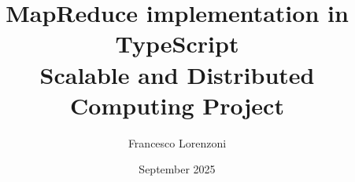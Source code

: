 


\lstset{language=JavaScript}



\lstset{
  language=JavaScript
}

\let\oldverb\verb

\makeatletter
\def\verb{\@ifnextchar|{\verb@colored}{\oldverb}}
\def\verb@colored|#1|{\colorbox{mybg}{\footnotesize\ttfamily\color{mytext}\detokenize{#1}}}
\makeatother

\title{MapReduce implementation in TypeScript \\Scalable and Distributed Computing Project}
\author{Francesco Lorenzoni}
\date{September 2025}



\maketitle
\tableofcontents



